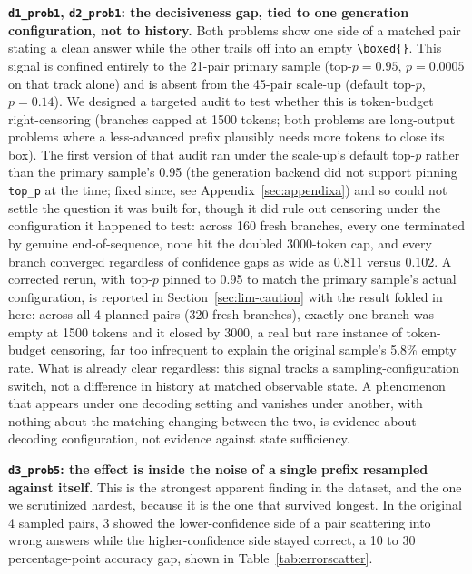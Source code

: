 \documentclass{article}
\begin{document}
\textbf{\texttt{d1\_prob1}, \texttt{d2\_prob1}: the decisiveness gap, tied to one generation configuration, not to history.} Both problems show one side of a matched pair stating a clean answer while the other trails off into an empty \texttt{\textbackslash boxed\{\}}. This signal is confined entirely to the 21-pair primary sample (top-$p=0.95$, $p=0.0005$ on that track alone) and is absent from the 45-pair scale-up (default top-$p$, $p=0.14$). We designed a targeted audit to test whether this is token-budget right-censoring (branches capped at 1500 tokens; both problems are long-output problems where a less-advanced prefix plausibly needs more tokens to close its box). The first version of that audit ran under the scale-up's default top-$p$ rather than the primary sample's 0.95 (the generation backend did not support pinning \texttt{top\_p} at the time; fixed since, see Appendix~\ref{sec:appendixa}) and so could not settle the question it was built for, though it did rule out censoring under the configuration it happened to test: across 160 fresh branches, every one terminated by genuine end-of-sequence, none hit the doubled 3000-token cap, and every branch converged regardless of confidence gaps as wide as 0.811 versus 0.102. A corrected rerun, with top-$p$ pinned to 0.95 to match the primary sample's actual configuration, is reported in Section~\ref{sec:lim-caution} with the result folded in here: across all 4 planned pairs (320 fresh branches), exactly one branch was empty at 1500 tokens and it closed by 3000, a real but rare instance of token-budget censoring, far too infrequent to explain the original sample's 5.8\% empty rate. What is already clear regardless: this signal tracks a sampling-configuration switch, not a difference in history at matched observable state. A phenomenon that appears under one decoding setting and vanishes under another, with nothing about the matching changing between the two, is evidence about decoding configuration, not evidence against state sufficiency.

\textbf{\texttt{d3\_prob5}: the effect is inside the noise of a single prefix resampled against itself.} This is the strongest apparent finding in the dataset, and the one we scrutinized hardest, because it is the one that survived longest. In the original 4 sampled pairs, 3 showed the lower-confidence side of a pair scattering into wrong answers while the higher-confidence side stayed correct, a 10 to 30 percentage-point accuracy gap, shown in Table~\ref{tab:errorscatter}.
\end{document}

